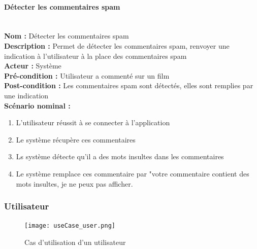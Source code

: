 \documentclass[12pt]{article}
\begin{document}
\paragraph{Détecter les commentaires spam}
\leavevmode \\
\textbf{Nom :} Détecter les commentaires spam\\
\textbf{Description :} Permet de détecter les commentaires spam, renvoyer une indication à l'utilisateur à la place des commentaires spam\\
\textbf{Acteur :} Système\\
\textbf{Pré-condition : } Utilisateur a commenté sur un film\\
\textbf{Post-condition : } Les commentaires spam sont détectés, elles sont remplies par une indication\\
\textbf{Scénario nominal : }
\begin{enumerate}
	\item L'utilisateur réussit à se connecter à l'application
	\item Le système récupère ces commentaires
	\item Ls système détecte qu'il a des mots insultes dans les commentaires
	\item Le système remplace ces commentaire par "votre commentaire contient des mots insultes, je ne peux pas afficher.
\end{enumerate}


\subsubsection{Utilisateur}
\begin{figure}[H]
	\centering
	\texttt{[image: useCase\_user.png]}
	\caption{Cas d'utilisation d'un utilisateur}
	\label{fig:my_label}
\end{figure}
\end{document}
